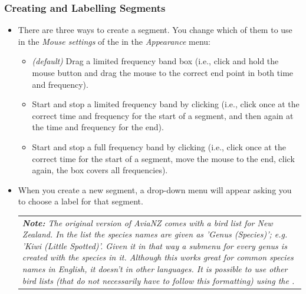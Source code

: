 \documentclass{scrartcl}
\begin{document}
\subsubsection*{Creating and Labelling Segments}\label{sec:labelSegments}

\begin{itemize}
	\item There are three ways to create a segment. You change which of them to use in the \textit{Mouse settings} of the \textit{} in the \textit{Appearance} menu:

	\begin{itemize}
		\item \textit{(default)} Drag a limited frequency band box (i.e., click and hold the mouse button and drag the mouse to the correct end point in both time and frequency).
		\item Start and stop a limited frequency band by clicking (i.e., click once at the correct time and frequency for the start of a segment, and then again at the time and frequency for the end).
		\item Start and stop a full frequency band by clicking (i.e., click once at the correct time for the start of a segment, move the mouse to the end, click again, the box covers all frequencies).
	\end{itemize}
	
	\item When you create a new segment, a drop-down menu will appear asking you to choose a label for that segment. 

		\begin{table}[h!]
		\centering
		\begin{tabular}{p{}}
			\textit{\textbf{Note:} The original version of AviaNZ comes with a bird list for New Zealand. In the list the species names are given as 'Genus (Species)'; e.g. 'Kiwi (Little Spotted)'. Given it in that way a submenu for every genus is created with the species in it. Although this works great for common species names in English, it doesn't in other languages. It is possible to use other bird lists (that do not necessarily have to follow this formatting) using the \textit{\nameref{sec:interfacesettings}}.}\\
		\end{tabular}
	\end{table}


\end{itemize}
\end{document}
